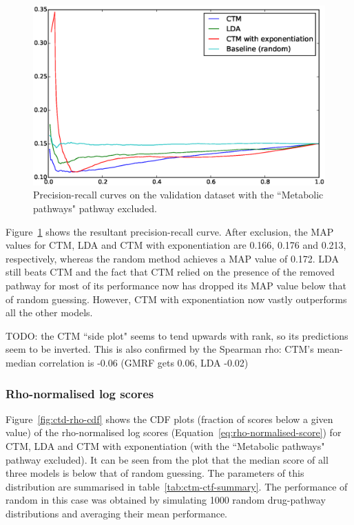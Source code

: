 \documentclass[12pt,a4paper,twoside,openright]{report}
\begin{document}
\begin{figure}[!htb]
\includegraphics[width=\textwidth]{ctd-pr-curves-no1100.eps}
\caption{Precision-recall curves on the validation dataset with the ``Metabolic pathways" pathway excluded.}
\label{fig:ctd-pr-curves-no1100}
\end{figure}

Figure~\ref{fig:ctd-pr-curves-no1100} shows the resultant precision-recall curve. After exclusion, the MAP values for CTM, LDA and CTM with exponentiation are 0.166, 0.176 and 0.213, respectively, whereas the random method achieves a MAP value of 0.172. LDA still beats CTM and the fact that CTM relied on the presence of the removed pathway for most of its performance now has dropped its MAP value below that of random guessing. However, CTM with exponentiation now vastly outperforms all the other models.

TODO: the CTM ``side plot" seems to tend upwards with rank, so its predictions seem to be inverted. This is also confirmed by the Spearman rho: CTM's mean-median correlation is -0.06 (GMRF gets 0.06, LDA -0.02)

\subsubsection{Rho-normalised log scores}
Figure~\ref{fig:ctd-rho-cdf} shows the CDF plots (fraction of scores below a given value) of the rho-normalised log scores (Equation~\ref{eq:rho-normalised-score}) for CTM, LDA and CTM with exponentiation (with the ``Metabolic pathways" pathway excluded). It can be seen from the plot that the median score of all three models is below that of random guessing. The parameters of this distribution are summarised in table~\ref{tab:ctm-ctf-summary}. The performance of random in this case was obtained by simulating 1000 random drug-pathway distributions and averaging their mean performance.
\end{document}
